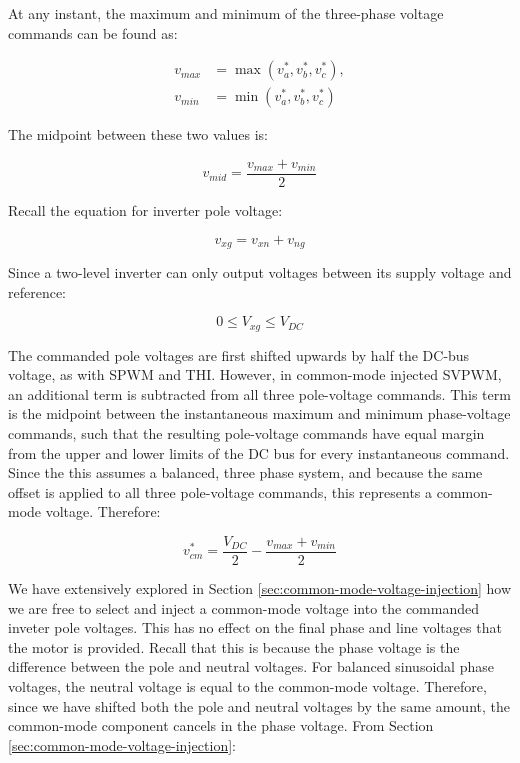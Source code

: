 \documentclass{article}
\begin{document}
At any instant, the maximum and minimum of the three-phase voltage commands can be found as:

\begin{align}
    v_{max} &= \max(v_a^*, v_b^*, v_c^*), \\[6pt]
    v_{min} &= \min(v_a^*, v_b^*, v_c^*)
\end{align}

The midpoint between these two values is:

\begin{equation}
    v_{mid} = \frac{v_{max} + v_{min}}{2}
\end{equation}

Recall the equation for inverter pole voltage:

\begin{equation}
    v_{xg} = v_{xn} + v_{ng}
\end{equation}

Since a two-level inverter can only output voltages between its supply voltage and reference:

\[
    0 \leq V_{xg} \leq V_{DC}
\]

The commanded pole voltages are first shifted upwards by half the DC-bus voltage, as with SPWM and THI. However, in common-mode injected SVPWM, an additional term is subtracted from all three pole-voltage commands. This term is the midpoint between the instantaneous maximum and minimum phase-voltage commands, such that the resulting pole-voltage commands have equal margin from the upper and lower limits of the DC bus for every instantaneous command. Since the this assumes a balanced, three phase system, and because the same offset is applied to all three pole-voltage commands, this represents a common-mode voltage. Therefore:

\begin{equation}
    v_{cm}^* = \frac{V_{DC}}{2} - \frac{v_{max} + v_{min}}{2}
\end{equation}

We have extensively explored in Section \ref{sec:common-mode-voltage-injection} how we are free to select and inject a common-mode voltage into the commanded inveter pole voltages. This has no effect on the final phase and line voltages that the motor is provided. Recall that this is because the phase voltage is the difference between the pole and neutral voltages. For balanced sinusoidal phase voltages, the neutral voltage is equal to the common-mode voltage. Therefore, since we have shifted both the pole and neutral voltages by the same amount, the common-mode component cancels in the phase voltage. From Section \ref{sec:common-mode-voltage-injection}:
\end{document}
